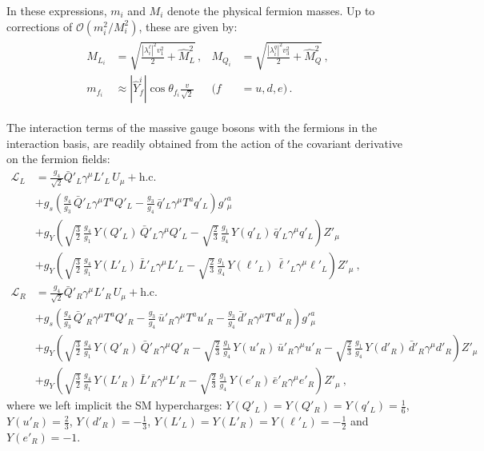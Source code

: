 In these expressions, $m_i$ and $M_i$ denote the physical fermion masses. Up to corrections of $\mathcal{O}(m_i^2 / M_i^2)$, these are given by:
\begin{align}\label{eq:ferm_masses}
\begin{aligned}
M_{L_i} &= \sqrt{\frac{|\lambda_i^\ell|^2 v_1^2}{2} + \hat M_L^2}\,, &
M_{Q_i} &= \sqrt{\frac{|\lambda_i^q|^2 v_3^2}{2} + \hat M_Q^2}\,, \\[2pt]
m_{f_i} &\approx |\hat Y_f^i| \cos\theta_{f_i} \frac{v}{\sqrt{2}} & (f &= u, d, e)\,.
\end{aligned}
\end{align}

The interaction terms of the massive gauge bosons with the fermions in the interaction basis, are readily obtained from the action of the covariant derivative on the fermion fields: 
\begin{align}
\mathcal{L}_L &= \frac{g_4}{\sqrt{2}} \bar{Q}'_L \gamma^\mu L'_L \, U_\mu + \textrm{h.c.}~\nonumber \\
& + g_s \left( \frac{g_4}{g_3} \, \bar{Q}'_L \gamma^\mu T^a Q'_L - \frac{g_3}{g_4} \,\bar{q}'_L \gamma^\mu T^a q'_L \right) g'^a_\mu ~\nonumber \\
&+g_Y \left( \sqrt{\frac{3}{2}}\,\frac{g_4}{g_1}\,Y(Q'_L) \, \bar{Q}'_L \gamma^\mu Q'_L - \sqrt{\frac{2}{3}}\,\frac{g_1}{g_4}\,Y(q'_L) \, \bar{q}'_L \gamma^\mu q'_L \right) Z'_\mu ~\nonumber\\
&+ g_Y \left( \sqrt{\frac{3}{2}}\,\frac{g_4}{g_1}\,Y(L'_L) \, \bar{L}'_L \gamma^\mu L'_L - \sqrt{\frac{2}{3}}\,\frac{g_1}{g_4}\,Y(\ell'_L) \, \bar{\ell}'_L \gamma^\mu \ell'_L \right) Z'_\mu~,\label{eq:coupL}\\[10pt]
\mathcal{L}_R &= \frac{g_4}{\sqrt{2}} \bar{Q}'_R \gamma^\mu L'_R \, U_\mu + \textrm{h.c.}~\nonumber \\
& + g_s \left( \frac{g_4}{g_3} \, \bar{Q}'_R \gamma^\mu T^a Q'_R - \frac{g_3}{g_4}  \,\bar{u}'_R \gamma^\mu T^a u'_R -\frac{g_3}{g_4} \,\bar{d}'_R \gamma^\mu T^a d'_R  \right) g'^a_\mu ~\nonumber \\
&+ g_Y \left( \sqrt{\frac{3}{2}}\,\frac{g_4}{g_1}\,Y(Q'_R) \,\bar{Q}'_R \gamma^\mu Q'_R - \sqrt{\frac{2}{3}}\,\frac{g_1}{g_4}\, Y(u'_R) \, \bar{u}'_R \gamma^\mu u'_R -\sqrt{\frac{2}{3}}\,\frac{g_1}{g_4}\, Y(d'_R) \, \bar{d}'_R \gamma^\mu d'_R \right) Z'_\mu ~\nonumber\\
&+g_Y \left( \sqrt{\frac{3}{2}}\,\frac{g_4}{g_1}\,Y(L'_R) \, \bar{L}'_R \gamma^\mu L'_R - \sqrt{\frac{2}{3}}\,\frac{g_1}{g_4}\,
Y(e'_R) \, \bar{e}'_R \gamma^\mu e'_R \right) Z'_\mu~,\label{eq:coupR}
\end{align}
where we left implicit the SM hypercharges: 
$Y(Q'_{L}) = Y(Q'_{R}) = Y(q'_{L}) = \tfrac{1}{6}$, $Y(u'_R) = \tfrac{2}{3}$, $Y(d'_R) = -\tfrac{1}{3}$, 
$Y(L'_L) = Y(L'_R) = Y(\ell'_L) = -\tfrac{1}{2}$ and $Y(e'_R) = -1$.   

